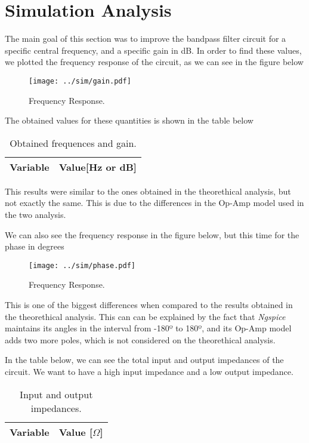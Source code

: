 \section{Simulation Analysis}
\label{sec:simulation}

The main goal of this section was to improve the bandpass filter circuit for a specific central frequency, and a specific gain in dB. In order to find these values, we plotted the frequency response of the circuit, as we can see in the figure below

\begin{figure}[H] \centering
\texttt{[image: ../sim/gain.pdf]}
\caption{Frequency Response.}
\end{figure}

The obtained values for these quantities is shown in the table below

\begin{table}[H]
  \centering
  \begin{tabular}{|l|r|}
    \hline    
    {\bf Variable} & {\bf Value[Hz or dB]} \\ \hline
    
  \end{tabular}
  \caption{Obtained frequences and gain.}
\end{table}

This results were similar to the ones obtained in the theorethical analysis, but not exactly the same. This is due to the differences in the Op-Amp model used in the two analysis.
\par

We can also see the frequency response in the figure below, but this time for the phase in degrees

\begin{figure}[H] \centering
\texttt{[image: ../sim/phase.pdf]}
\caption{Frequency Response.}
\end{figure}

This is one of the biggest differences when compared to the results obtained in the theorethical analysis. This can can be explained by the fact that \textit{Ngspice} maintains its angles in the interval from -180º to 180º, and its Op-Amp model adds two more poles, which is not considered on the theorethical analysis. 
\par
In the table below, we can see the total input and output impedances of the circuit. We want to have a high input impedance and a low output impedance. 

\begin{table}[H]
  \centering
  \begin{tabular}{|l|r|}
    \hline    
    {\bf Variable} & {\bf Value [$\Omega$]} \\ \hline
    
    
  \end{tabular}
  \caption{Input and output impedances.}
\end{table}

